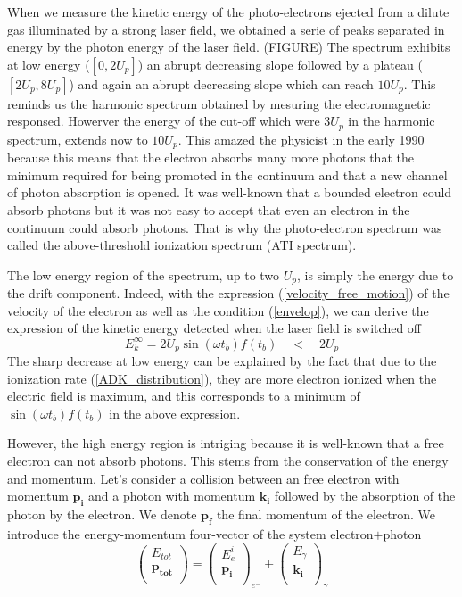 \documentclass[a4paper]{article}
\begin{document}
When we measure the kinetic energy of the photo-electrons ejected from a dilute gas illuminated by a strong laser field, we obtained a serie of peaks separated in energy by the photon energy of the laser field. (FIGURE) The spectrum exhibits at low energy ($[0,2U_{p}]$) an abrupt decreasing slope followed by a plateau ($[2U_{p},8U_{p}]$) and again an abrupt decreasing slope which can reach $10 U_{p}$. This reminds us the harmonic spectrum obtained by mesuring the electromagnetic responsed. Howerver the energy of the cut-off which were $3U_{p}$ in the harmonic spectrum, extends now to $10U_{p}$. This amazed the physicist in the early 1990 because this means that the electron absorbs many more photons that the minimum required for being promoted in the continuum and that a new channel of photon absorption is opened. It was well-known that a bounded electron could absorb photons but it was not easy to accept that even an electron in the continuum could absorb photons. That is why the photo-electron spectrum was called the above-threshold ionization spectrum (ATI spectrum).
\par
The low energy region of the spectrum, up to two $U_{p}$, is simply the energy due to the drift component. Indeed, with the expression (\ref{velocity_free_motion}) of the velocity of the electron as well as the condition (\ref{envelop}), we can derive the expression of the kinetic energy detected when the laser field is switched off
\begin{equation}
E_{k}^{\infty}=2U_{p}\sin(\omega t_{b})f(t_{b}) \quad < \quad 2U_{p}
\end{equation}
The sharp decrease at low energy can be explained by the fact that due to the ionization rate (\ref{ADK_distribution}), they are more electron ionized when the electric field is maximum, and this corresponds to a minimum of $\sin(\omega t_{b})f(t_{b})$ in the above expression.
\par
However, the high energy region is intriging because it is well-known that a free electron can not absorb photons. This stems from the conservation of the energy and momentum. Let's consider a collision between an free electron with momentum $\mathbf{p_{i}}$ and a photon with momentum $\mathbf{k_{i}}$ followed by the absorption of the photon by the electron. We denote $\mathbf{p_{f}}$ the final momentum of the electron. We introduce the energy-momentum four-vector of the system {electron$+$photon}
\begin{equation}
\left(
\begin{array}{c}
E_{tot}\\
\mathbf{p_{tot}}\\
\end{array}
\right)
=
\left(
\begin{array}{c}
E_{e}^{i}\\
\mathbf{p_{i}}\\
\end{array}
\right)_{e^{-}}
+\left(
\begin{array}{c}
E_{\gamma}\\
\mathbf{k_{i}}\\
\end{array}
\right)_{\gamma}
\end{equation}
\end{document}
